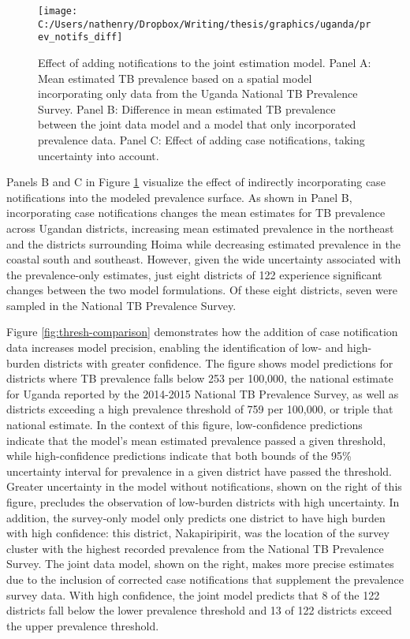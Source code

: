 \documentclass[
]{article}
\begin{document}
\begin{figure}[!ht]

{\centering \texttt{[image: C:/Users/nathenry/Dropbox/Writing/thesis/graphics/uganda/prev\_notifs\_diff]} 

}

\caption{Effect of adding notifications to the joint estimation model. Panel A: Mean estimated TB prevalence based on a spatial model incorporating only data from the Uganda National TB Prevalence Survey. Panel B: Difference in mean estimated TB prevalence between the joint data model and a model that only incorporated prevalence data. Panel C: Effect of adding case notifications, taking uncertainty into account.}\label{fig:prev-notifs-diff}
\end{figure}

Panels B and C in Figure \ref{fig:prev-notifs-diff} visualize the effect of indirectly incorporating case notifications into the modeled prevalence surface. As shown in Panel B, incorporating case notifications changes the mean estimates for TB prevalence across Ugandan districts, increasing mean estimated prevalence in the northeast and the districts surrounding Hoima while decreasing estimated prevalence in the coastal south and southeast. However, given the wide uncertainty associated with the prevalence-only estimates, just eight districts of 122 experience significant changes between the two model formulations. Of these eight districts, seven were sampled in the National TB Prevalence Survey.

Figure \ref{fig:thresh-comparison} demonstrates how the addition of case notification data increases model precision, enabling the identification of low- and high-burden districts with greater confidence. The figure shows model predictions for districts where TB prevalence falls below 253 per 100,000, the national estimate for Uganda reported by the 2014-2015 National TB Prevalence Survey, as well as districts exceeding a high prevalence threshold of 759 per 100,000, or triple that national estimate. In the context of this figure, low-confidence predictions indicate that the model's mean estimated prevalence passed a given threshold, while high-confidence predictions indicate that both bounds of the 95\% uncertainty interval for prevalence in a given district have passed the threshold. Greater uncertainty in the model without notifications, shown on the right of this figure, precludes the observation of low-burden districts with high uncertainty. In addition, the survey-only model only predicts one district to have high burden with high confidence: this district, Nakapiripirit, was the location of the survey cluster with the highest recorded prevalence from the National TB Prevalence Survey. The joint data model, shown on the right, makes more precise estimates due to the inclusion of corrected case notifications that supplement the prevalence survey data. With high confidence, the joint model predicts that 8 of the 122 districts fall below the lower prevalence threshold and 13 of 122 districts exceed the upper prevalence threshold.
\end{document}
